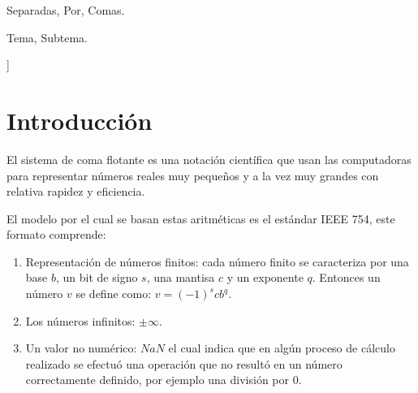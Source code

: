 \documentclass[a4paper,10pt,twocolumn]{article}
\begin{document}
\begin{keywords}
	Separadas,
	Por,
	Comas.
\end{keywords}

\begin{topics}
	Tema, Subtema.
\end{topics}


\vspace{0.8cm}
]



\section{Introducción}\label{sec:intro}
	El sistema de coma flotante es una notación científica que usan las computadoras para representar números reales muy pequeños y a la vez muy grandes con relativa rapidez y eficiencia.
  
	El modelo por el cual se basan estas aritméticas es el estándar IEEE 754, este formato comprende:
	\begin{enumerate}
  
  		\item Representación de números finitos: cada número finito se caracteriza por una base $b$, un bit de signo $s$, una mantisa $c$ y un exponente $q$. Entonces un número $v$ se define como: $v=(-1)^s c b^q$. 
  	
  		\item Los números infinitos: $\pm\infty$.
  	
  		\item Un valor no numérico: $NaN$ el cual indica que en algún proceso de cálculo realizado se efectuó una operación que no resultó en un número correctamente definido, por ejemplo una división por 0.
	\end{enumerate}
  
\end{document}
